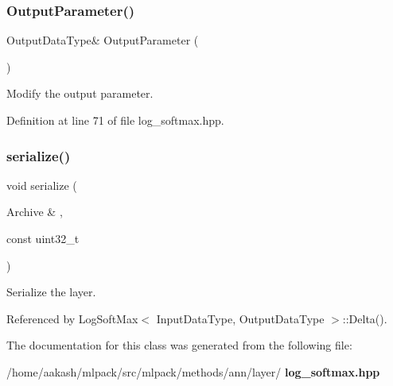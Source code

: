 \subsubsection{Output\+Parameter()\hspace{0.1cm}{\footnotesize\ttfamily [2/2]}}
{\footnotesize\ttfamily Output\+Data\+Type\& Output\+Parameter (\begin{DoxyParamCaption}{ }\end{DoxyParamCaption})\hspace{0.3cm}{\ttfamily [inline]}}



Modify the output parameter. 



Definition at line 71 of file log\+\_\+softmax.\+hpp.

\mbox{\label{classmlpack_1_1ann_1_1LogSoftMax_aa2ccb5a0533a6ba0abe6dfc1f98fbafb}} 
\subsubsection{serialize()}
{\footnotesize\ttfamily void serialize (\begin{DoxyParamCaption}\item[{Archive \&}]{,  }\item[{const uint32\+\_\+t}]{ }\end{DoxyParamCaption})}



Serialize the layer. 



Referenced by Log\+Soft\+Max$<$ Input\+Data\+Type, Output\+Data\+Type $>$\+::\+Delta().



The documentation for this class was generated from the following file\+:\begin{DoxyCompactItemize}
\item 
/home/aakash/mlpack/src/mlpack/methods/ann/layer/\textbf{ log\+\_\+softmax.\+hpp}\end{DoxyCompactItemize}
